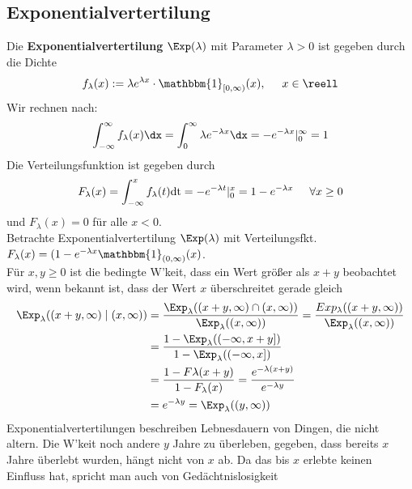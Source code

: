 \documentclass{kit}
\begin{document}
  \subsection{Exponentialvertertilung}
    Die \textbf{Exponentialvertertilung} $\Exp(\lambda)$ mit Parameter $\lambda>0$ ist gegeben durch die Dichte
    $$f_\lambda(x):=\lambda e^{\-\lambda x}\cdot\mathbbm{1}_{[0,\infty)}(x),\hspace{0.5cm}x\in\reell$$
    Wir rechnen nach:
    $$\int^\infty_{-\infty}f_\lambda(x)\dx=\int^\infty_0\lambda e^{-\lambda x}\dx=-e^{-\lambda x}|^\infty_0=1$$
    Die Verteilungsfunktion ist gegeben durch
    $$F_\lambda(x)=\int^x_{-\infty}f_\lambda(t)\text{dt}=-e^{-\lambda t}|^x_0=1-e^{-\lambda x}\hspace{0.5cm}\forall x\ge0$$
    und $F_\lambda(x)=0$ für alle $x<0$.\\
    Betrachte Exponentialvertertilung $\Exp(\lambda)$ mit Verteilungsfkt. 
    $F_\lambda(x)=(1-e^{-\lambda x}\mathbbm{1}_{(0,\infty)}(x)$.\\
    Für $x,y\ge0$ ist die bedingte W'keit, dass ein Wert größer als $x+y$ beobachtet wird, wenn bekannt ist, dass der 
    Wert $x$ überschreitet gerade gleich
    $$\begin{aligned}
      \Exp_\lambda((x+y,\infty)\mid(x,\infty)) & =\frac{\Exp_\lambda((x+y,\infty)\cap(x,\infty))}
      {\Exp_\lambda((x,\infty))}=\frac{Exp_\lambda((x+y,\infty))}{\Exp_\lambda((x,\infty))} \\
       & =\frac{1-\Exp_\lambda((-\infty,x+y])}{1-\Exp_\lambda((-\infty,x])} \\
       & =\frac{1-F\lambda(x+y)}{1-F_\lambda(x)}=\frac{e^{-\lambda(x+y)}}{e^{-\lambda y}} \\
       & =e^{-\lambda y}=\Exp_\lambda((y,\infty))
    \end{aligned}$$
    Exponentialvertertilungen beschreiben Lebnesdauern von Dingen, die nicht altern. Die W'keit noch andere $y$ Jahre zu 
    überleben, gegeben, dass bereits $x$ Jahre überlebt wurden, hängt nicht von $x$ ab. Da das bis $x$ erlebte keinen
    Einfluss hat, spricht man auch von Gedächtnislosigkeit




    
\end{document}
